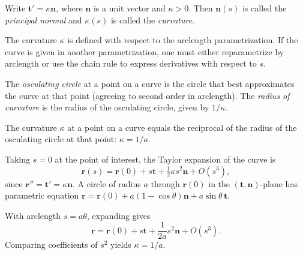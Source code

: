 \documentclass[a4paper]{article}
\begin{document}
\begin{defi}
  Write $\mathbf{t}' = \kappa \mathbf{n}$, where $\mathbf{n}$ is a unit vector and $\kappa > 0$. Then $\mathbf{n}(s)$ is called the \emph{principal normal} and $\kappa(s)$ is called the \emph{curvature}.
\end{defi}

\begin{rmk}
  The curvature $\kappa$ is defined with respect to the arclength parametrization. If the curve is given in another parametrization, one must either reparametrize by arclength or use the chain rule to express derivatives with respect to $s$.
\end{rmk}

\begin{defi}
  The \emph{osculating circle} at a point on a curve is the circle that best approximates the curve at that point (agreeing to second order in arclength). The \emph{radius of curvature} is the radius of the osculating circle, given by $1/\kappa$.
\end{defi}

\begin{prop}
  The curvature $\kappa$ at a point on a curve equals the reciprocal of the radius of the osculating circle at that point: $\kappa = 1/a$.
\end{prop}

\begin{rmk}
  Taking $s = 0$ at the point of interest, the Taylor expansion of the curve is
  \[
    \mathbf{r}(s) = \mathbf{r}(0) + s\mathbf{t} + \tfrac{1}{2}\kappa s^2 \mathbf{n} + O(s^3),
  \]
  since $\mathbf{r}'' = \mathbf{t}' = \kappa \mathbf{n}$. A circle of radius $a$ through $\mathbf{r}(0)$ in the $(\mathbf{t}, \mathbf{n})$-plane has parametric equation $\mathbf{r} = \mathbf{r}(0) + a(1 - \cos \theta) \mathbf{n} + a\sin \theta\, \mathbf{t}$.
  \begin{center}
  \end{center}
  With arclength $s = a\theta$, expanding gives
  \[
    \mathbf{r} = \mathbf{r}(0) + s\mathbf{t} + \frac{1}{2a}s^2\mathbf{n} + O(s^3).
  \]
  Comparing coefficients of $s^2$ yields $\kappa = 1/a$.
\end{rmk}
\end{document}
